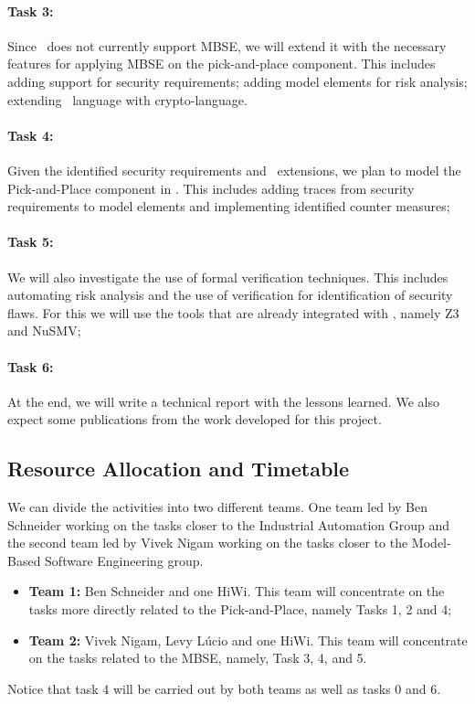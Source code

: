 \paragraph{Task 3:} Since \autofocus\ does not currently support MBSE, we will extend it with the necessary features for applying MBSE on the pick-and-place component. This includes adding support for security requirements; adding model elements for risk analysis; extending \autofocus\ language with crypto-language.

\paragraph{Task 4:} Given the identified security requirements and \autofocus\ extensions, we plan to model the Pick-and-Place component in \autofocus. This includes adding traces from security requirements to model elements and implementing identified counter measures;

\paragraph{Task 5:} We will also investigate the use of formal verification techniques. This includes automating risk analysis and the use of verification for identification of security flaws. For this we will use the tools that are already integrated with \autofocus, namely Z3 and NuSMV;

\paragraph{Task 6:} At the end, we will write a technical report with the lessons learned. We also expect some publications from the work developed for this project.


\subsection{Resource Allocation and Timetable}

We can divide the activities into two different teams. One team led by Ben Schneider working on the tasks closer to the Industrial Automation Group and the second team led by Vivek Nigam working on the tasks closer to the Model-Based Software Engineering group.

\begin{itemize}
  \item \textbf{Team 1:} Ben Schneider and one HiWi. This team will concentrate on the tasks more directly related to the Pick-and-Place, namely Tasks 1, 2 and 4;
  \item \textbf{Team 2:} Vivek Nigam, Levy Lúcio and one HiWi. This team will concentrate on the tasks related to the MBSE, namely, Task 3, 4, and 5.
\end{itemize}
Notice that task 4 will be carried out by both teams as well as tasks 0 and 6.

